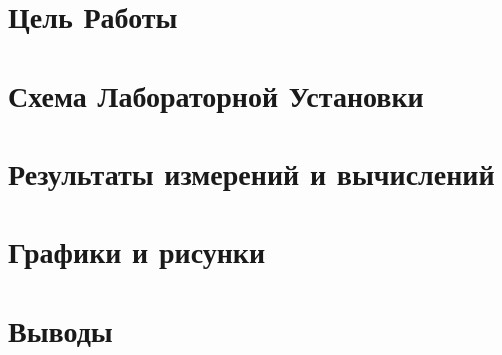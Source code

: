 





\newpage
\section{Цель Работы}
\label{sec:target}

\newpage
\section{Схема Лабораторной Установки}
\label{sec:schema}

\newpage
\section{Результаты измерений и вычислений}
\label{sec:results}
%

\newpage
\section{Графики и рисунки}
\label{sec:plots}
%

\newpage
\section{Выводы} %
\label{sec:reasons}


